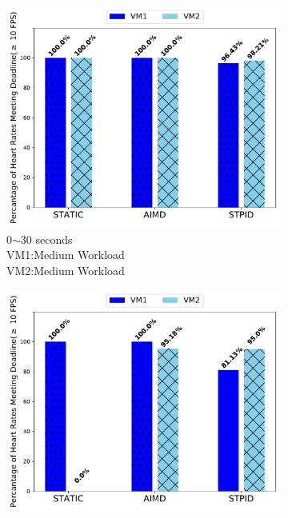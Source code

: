 \begin{figure}[ht!]
\centering
\begin{subfigure}{.45\textwidth}
    \centering
    \includegraphics[width=1\linewidth]{images/2vm_r1} 
    \captionsetup{justification=centering}
    \caption{0$\sim$30 seconds\\VM1:Medium Workload\\VM2:Medium Workload}
    \label{2vm_r1}
\end{subfigure}
\begin{subfigure}{.45\textwidth}
    \centering
    \includegraphics[width=1\linewidth]{images/2vm_r2} 
    \captionsetup{justification=centering}


\end{subfigure}
\end{figure}

